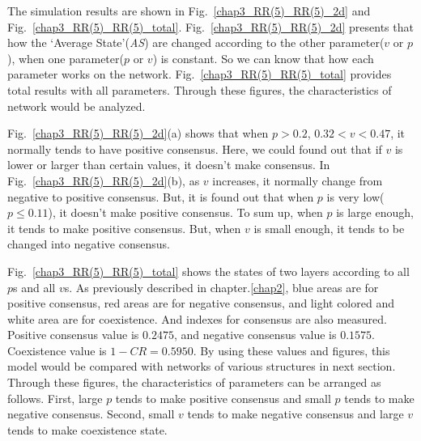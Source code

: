 The simulation results are shown in Fig.~\ref{chap3_RR(5)_RR(5)_2d} and Fig.~\ref{chap3_RR(5)_RR(5)_total}.  Fig.~\ref{chap3_RR(5)_RR(5)_2d} presents that how the `Average State'(\textit{AS}) are changed according to the other parameter($v$ or $p$), when one parameter($p$ or $v$) is constant. So we can know that how each parameter works on the network. Fig.~\ref{chap3_RR(5)_RR(5)_total} provides total results with all parameters. Through these figures, the characteristics of network would be analyzed.

Fig.~\ref{chap3_RR(5)_RR(5)_2d}(a) shows that when $p > 0.2$, $0.32 < v < 0.47$, it normally tends to have positive consensus. Here, we could found out that if $v$ is lower or larger than certain values, it doesn't make consensus. In Fig.~\ref{chap3_RR(5)_RR(5)_2d}(b), as $v$ increases, it normally change from negative to positive consensus. But, it is found out that when $p$ is very low($p \le 0.11$), it doesn't make positive consensus.  To sum up, when $p$ is large enough, it tends to make positive consensus. But, when $v$ is small enough, it tends to be changed into negative consensus.

Fig.~\ref{chap3_RR(5)_RR(5)_total} shows the states of two layers according to all $p$s and all $v$s. As previously described in chapter.\ref{chap2}, blue areas are for positive consensus, red areas are for negative consensus, and light colored and white area are for coexistence. And indexes for consensus are also measured. Positive consensus value is $0.2475$, and negative consensus value is $0.1575$. Coexistence value is $1 - CR = 0.5950$. By using these values and figures, this model would be compared with networks of various structures in next section. Through these figures, the characteristics of parameters can be arranged as follows. First, large $p$ tends to make positive consensus and small $p$ tends to make negative consensus. Second, small $v$ tends to make negative consensus and large $v$ tends to make coexistence state. \\

